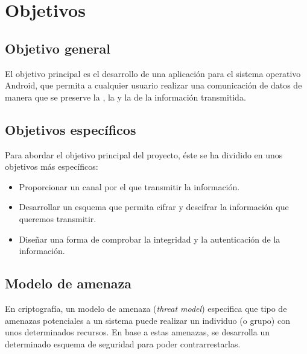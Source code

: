 
\chapter{Objetivos} %

\label{Chapter2}


\section{Objetivo general}

El objetivo principal es el desarrollo de una aplicación para el sistema operativo
Android, que permita a cualquier usuario realizar una comunicación de datos
de manera que se preserve la , la 
y la  de la información transmitida.


\section{Objetivos específicos}

Para abordar el objetivo principal del proyecto, éste se ha dividido en unos
objetivos más específicos:

\begin{itemize}
  \item Proporcionar un canal por el que transmitir la información.
  \item Desarrollar un esquema que permita cifrar y descifrar la información que queremos transmitir.
  \item Diseñar una forma de comprobar la integridad y la autenticación de la información.
\end{itemize}


\section{Modelo de amenaza}

En criptografía, un modelo de amenaza (\emph{threat model}) especifica que tipo
de amenazas potenciales a un sistema puede realizar un individuo (o grupo) con
unos determinados recursos. En base a estas amenazas, se desarrolla un
determinado esquema de seguridad para poder contrarrestarlas.

